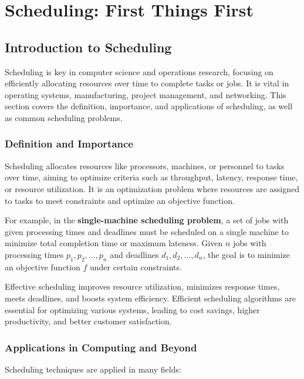 \documentclass[12pt]{book} %
\begin{document}
\chapter{Scheduling: First Things First}

\section{Introduction to Scheduling}

Scheduling is key in computer science and operations research, focusing on efficiently allocating resources over time to complete tasks or jobs. It is vital in operating systems, manufacturing, project management, and networking. This section covers the definition, importance, and applications of scheduling, as well as common scheduling problems.

\subsection{Definition and Importance}

Scheduling allocates resources like processors, machines, or personnel to tasks over time, aiming to optimize criteria such as throughput, latency, response time, or resource utilization. It is an optimization problem where resources are assigned to tasks to meet constraints and optimize an objective function.

For example, in the \textbf{single-machine scheduling problem}, a set of jobs with given processing times and deadlines must be scheduled on a single machine to minimize total completion time or maximum lateness. Given \(n\) jobs with processing times \(p_1, p_2, \ldots, p_n\) and deadlines \(d_1, d_2, \ldots, d_n\), the goal is to minimize an objective function \(f\) under certain constraints.

Effective scheduling improves resource utilization, minimizes response times, meets deadlines, and boosts system efficiency. Efficient scheduling algorithms are essential for optimizing various systems, leading to cost savings, higher productivity, and better customer satisfaction.

\subsection{Applications in Computing and Beyond}

Scheduling techniques are applied in many fields:
\end{document}
